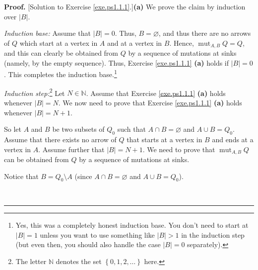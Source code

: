 \documentclass[numbers=enddot,12pt,final,onecolumn,notitlepage]{scrartcl}%
\numberwithin{exer}{section}
\theoremstyle{definition}
\newenvironment{proof}[1][Proof]{\noindent\textbf{#1.} }{\ \rule{0.5em}{0.5em}}
\begin{document}
\begin{proof}
[Solution to Exercise \ref{exe.ps1.1.1}.]\textbf{(a)} We prove the claim by
induction over $\left\vert B\right\vert $.

\textit{Induction base:} Assume that $\left\vert B\right\vert =0$. Thus,
$B=\varnothing$, and thus there are no arrows of $Q$ which start at a vertex
in $A$ and at a vertex in $B$. Hence, $\operatorname*{mut}\nolimits_{A,B}Q=Q$,
and this can clearly be obtained from $Q$ by a sequence of mutations at sinks
(namely, by the empty sequence). Thus, Exercise \ref{exe.ps1.1.1} \textbf{(a)}
holds if $\left\vert B\right\vert =0$. This completes the induction
base.\footnote{Yes, this was a completely honest induction base. You don't
need to start at $\left\vert B\right\vert =1$ unless you want to use something
like $\left\vert B\right\vert >1$ in the induction step (but even then, you
should also handle the case $\left\vert B\right\vert =0$ separately).}

\textit{Induction step:}\footnote{The letter $\mathbb{N}$ denotes the set
$\left\{  0,1,2,\ldots\right\}  $ here.} Let $N\in\mathbb{N}$. Assume that
Exercise \ref{exe.ps1.1.1} \textbf{(a)} holds whenever $\left\vert
B\right\vert =N$. We now need to prove that Exercise \ref{exe.ps1.1.1}
\textbf{(a)} holds whenever $\left\vert B\right\vert =N+1$.

So let $A$ and $B$ be two subsets of $Q_{0}$ such that $A\cap B=\varnothing$
and $A\cup B=Q_{0}$. Assume that there exists no arrow of $Q$ that starts at a
vertex in $B$ and ends at a vertex in $A$. Assume further that $\left\vert
B\right\vert =N+1$. We need to prove that $\operatorname*{mut}\nolimits_{A,B}%
Q$ can be obtained from $Q$ by a sequence of mutations at sinks.

Notice that $B=Q_{0}\setminus A$ (since $A\cap B=\varnothing$ and $A\cup
B=Q_{0}$).


\end{proof}
\end{document}
